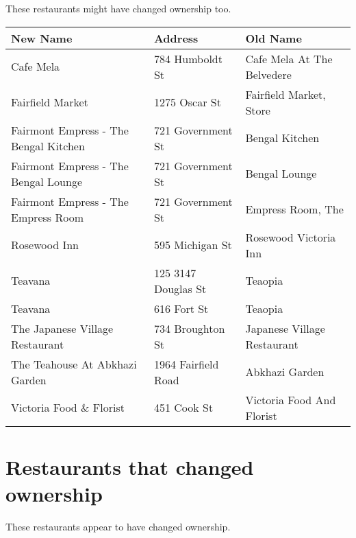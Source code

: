 \documentclass[9pt]{article}
\begin{document}
These restaurants might have changed ownership too.


\begin{center}
\begin{tabular}{l|l|l}
\textbf{New Name} & \textbf{Address} & \textbf{Old Name}\\
\hline
Cafe Mela & 784 Humboldt St & Cafe Mela At The Belvedere\\
Fairfield Market & 1275 Oscar St & Fairfield Market, Store\\
Fairmont Empress - The Bengal Kitchen & 721 Government St & Bengal Kitchen\\
Fairmont Empress - The Bengal Lounge & 721 Government St & Bengal Lounge\\
Fairmont Empress - The Empress Room & 721 Government St & Empress Room, The\\
Rosewood Inn & 595 Michigan St & Rosewood Victoria Inn\\
Teavana & 125 3147 Douglas St & Teaopia\\
Teavana & 616 Fort St & Teaopia\\
The Japanese Village Restaurant & 734 Broughton St & Japanese Village Restaurant\\
The Teahouse At Abkhazi Garden & 1964 Fairfield Road & Abkhazi Garden\\
Victoria Food \& Florist & 451 Cook St & Victoria Food And Florist\\
\end{tabular}
\end{center}


\section{Restaurants that changed ownership}
\label{sec-2}

These restaurants appear to have changed ownership.
\end{document}
